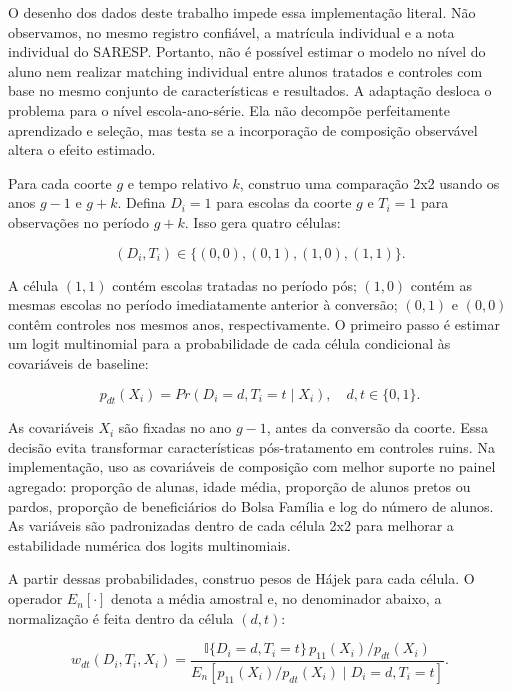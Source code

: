 O desenho dos dados deste trabalho impede essa implementação literal. Não observamos, no mesmo registro confiável, a matrícula individual e a nota individual do SARESP. Portanto, não é possível estimar o modelo no nível do aluno nem realizar matching individual entre alunos tratados e controles com base no mesmo conjunto de características e resultados. A adaptação desloca o problema para o nível escola-ano-série. Ela não decompõe perfeitamente aprendizado e seleção, mas testa se a incorporação de composição observável altera o efeito estimado.

Para cada coorte $g$ e tempo relativo $k$, construo uma comparação 2x2 usando os anos $g-1$ e $g+k$. Defina $D_i=1$ para escolas da coorte $g$ e $T_i=1$ para observações no período $g+k$. Isso gera quatro células:

\begin{equation}
(D_i,T_i) \in \{(0,0),(0,1),(1,0),(1,1)\}.
\end{equation}

A célula $(1,1)$ contém escolas tratadas no período pós; $(1,0)$ contém as mesmas escolas no período imediatamente anterior à conversão; $(0,1)$ e $(0,0)$ contêm controles nos mesmos anos, respectivamente. O primeiro passo é estimar um logit multinomial para a probabilidade de cada célula condicional às covariáveis de baseline:

\begin{equation}
p_{dt}(X_i)=Pr(D_i=d,T_i=t \mid X_i), \quad d,t \in \{0,1\}.
\end{equation}

As covariáveis $X_i$ são fixadas no ano $g-1$, antes da conversão da coorte. Essa decisão evita transformar características pós-tratamento em controles ruins. Na implementação, uso as covariáveis de composição com melhor suporte no painel agregado: proporção de alunas, idade média, proporção de alunos pretos ou pardos, proporção de beneficiários do Bolsa Família e log do número de alunos. As variáveis são padronizadas dentro de cada célula 2x2 para melhorar a estabilidade numérica dos logits multinomiais.

A partir dessas probabilidades, construo pesos de Hájek para cada célula. O operador $E_n[\cdot]$ denota a média amostral e, no denominador abaixo, a normalização é feita dentro da célula $(d,t)$:

\begin{equation}
w_{dt}(D_i,T_i,X_i)=
\frac{\mathbb{I}\{D_i=d,T_i=t\}\,p_{11}(X_i)/p_{dt}(X_i)}
{E_n[p_{11}(X_i)/p_{dt}(X_i) \mid D_i=d,T_i=t]}.
\end{equation}

